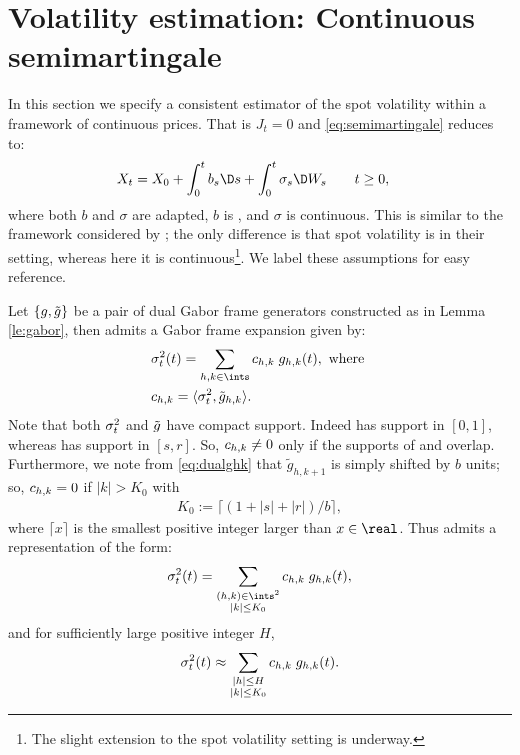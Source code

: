 \section{Volatility estimation: Continuous \ito semimartingale } \label{sec:estimator}
In this section we specify a consistent estimator of the spot volatility within a framework of continuous prices. That is $J_t = 0$ and \eqref{eq:semimartingale} reduces to:
\begin{align}
X_t & = X_0 + \int_0^t b_s \D s + \int_0^t \sigma_s \D W_s    \qquad t \ge 0 
  \label{eq:contsemimartingale},
\end{align}
where both $b$ and $\sigma$ are adapted, $b$ is \cadlag, and $\sigma$ is continuous.  This is similar to the framework considered by \cite{Hoffmann2012}; the only difference is that   spot volatility  is \cadlag in their setting, whereas here it is continuous\footnote{The slight extension to the \cadlag spot volatility setting is underway.}.  We label these assumptions for easy reference.

Let $\{g, \tilde{g}\}$ be a pair of dual Gabor frame generators constructed as in Lemma \eqref{le:gabor}, then   \sv admits a Gabor frame expansion given by:  
\begin{align}
  &\sv(t)  = \sum_{h,k \in \ints} \chk \;g_{h,k}(t), \text{ where } 
\\
&\chk = \langle \sv, \tilde{g}_{h,k} \rangle.
\end{align}
Note that both $\sigma_t^2$ and $\tilde{g}$ have compact support. Indeed \sv has support in $[0,1]$, whereas  \tg has support in $[s,r]$. So, ${c}_{h,k} \ne 0$ only if  the supports of \sv and \tghk overlap.  Furthermore, we note from \eqref{eq:dualghk} that $\tilde{g}_{h,k+1}$ is simply \tghk shifted by $b$ units; so, ${c}_{h,k} = 0$ if $|k| > K_0$ with 
\begin{align}
  K_0:= \lceil (1 + |s| + |r|)/b \rceil,
\end{align}
where $\lceil x\rceil$ is the smallest positive integer larger than $x \in \real$.  Thus \sv admits a  representation of the form: 
\begin{align}
  \sv(t) =  \sum_{\substack{(h,k) \in \ints^2\\\vert k \vert \le K_0}} \chk\;g_{h,k}(t) ,\notag
\end{align}
and  for sufficiently large positive integer $H$, 
 \begin{align}
 \sigma_t^2(t) \approx \sum_{\substack{\vert h \vert \le H \\\vert k \vert \le K_0}} {c}_{h,k}\;g_{h,k}(t). \notag
  \notag
   \label{}
 \end{align}
